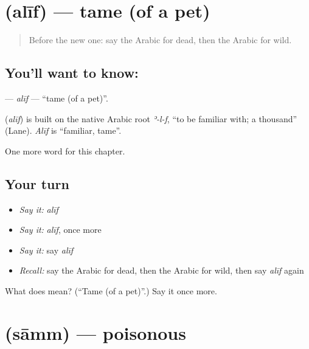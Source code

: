 \section[\texorpdfstring{\ar{أليف} (alīf)}{أليف (alīf)}]{ (alīf) — tame (of a pet)}

\label{lesson:AR-C242-alif}



\begin{quote}
Before the new one: say the Arabic for dead, then the Arabic for wild.
\end{quote}

\subsection*{You'll want to know: }
\textbf{} — \emph{alīf} — \textquotedblleft{}tame (of a pet)\textquotedblright{}.

\begin{cousinweb}
\textbf{} (\emph{alīf}) is built on the native Arabic root \emph{ʾ-l-f}, \textquotedblleft{}to be familiar with; a thousand\textquotedblright{} (Lane). \emph{Alīf} is \textquotedblleft{}familiar, tame\textquotedblright{}.
\end{cousinweb}

\begin{grammarlens}[title={What you've built}]
One more word for this chapter.
\end{grammarlens}

\subsection*{Your turn}
\begin{itemize}
\raggedright
  \item \emph{Say it:} \emph{alīf}
  \item \emph{Say it:} \emph{alīf}, once more
  \item \emph{Say it:} say \emph{alīf}
  \item \emph{Recall:} say the Arabic for dead, then the Arabic for wild, then say \emph{alīf} again
\end{itemize}

\begin{tcolorbox}[breakable,colback=teal!4,colframe=teal!35!black,title={Before you move on}]
What does  mean? (\textquotedblleft{}Tame (of a pet)\textquotedblright{}.) Say it once more.
\end{tcolorbox}
\section[\texorpdfstring{\ar{سام} (sāmm)}{سام (sāmm)}]{ (sāmm) — poisonous}


